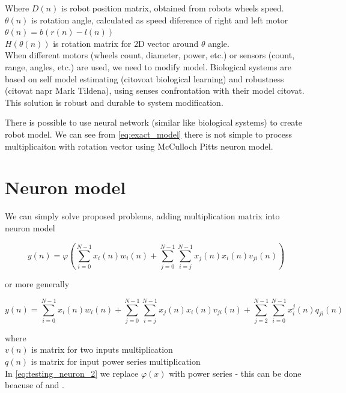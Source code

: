 \documentclass[10pt,a5paper]{article}
\begin{document}
Where
$D(n)$ is robot position matrix, obtained from robots wheels speed. \\
$\theta(n)$ is rotation angle, calculated as speed diference of right and left motor $\theta(n) = b(r(n) - l(n))$ \\
$H(\theta(n))$ is rotation matrix for 2D vector around $\theta$ angle. \\
When different motors (wheels count, diameter, power, etc.) or sensors (count, range, angles, etc.) are used, we need to modify model. Biological systems are based on self model estimating (citovoat biological learning) and robustness (citovat napr Mark Tildena), using senses confrontation with their model citovat. This solution is robust and durable to system modification.

There is possible to use neural network (similar like biological systems) to create robot model.
We can see from \ref{eq:exact_model} there is not simple to process multiplicaiton with rotation vector using McCulloch Pitts neuron model.



\section{Neuron model}

We can simply solve proposed problems, adding multiplication matrix into neuron model

\begin{equation}
\label{eq:testing_neuron_1}
  y(n) = \varphi(\sum_{i = 0}^{N-1} x_i(n)w_i(n) + \sum_{j = 0}^{N-1} \sum_{i = j}^{N-1} x_j(n)x_i(n)v_{ji}(n))
\end{equation}

or more generally

\begin{equation}
\label{eq:testing_neuron_2}
  y(n) = \sum_{i = 0}^{N-1} x_i(n)w_i(n) + \sum_{j = 0}^{N-1} \sum_{i = j}^{N-1} x_j(n)x_i(n)v_{ji}(n) +  \sum_{j = 2}^{N-1} \sum_{i = 0}^{N-1} x_i^j(n)q_{ji}(n)
\end{equation}

where \\
$v(n)$ is matrix for two inputs multiplication \\
$q(n)$ is matrix for input power series multiplication \\

In \ref{eq:testing_neuron_2} we replace $\varphi(x)$ with power series
- this can be done beacuse of \cite{bib:taylor_01} and \cite{bib:taylor_02}.
\end{document}

